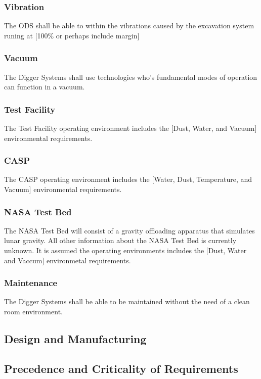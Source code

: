 \subsubsection{Vibration}
The ODS shall be able to within the vibrations caused by the excavation system runing at [100\% or perhaps include margin]
\subsubsection{Vacuum}
The Digger Systems shall use technologies who's fundamental modes of operation can function in a vacuum.
\subsubsection{Test Facility}
The Test Facility operating environment includes the [Dust, Water, and Vacuum] environmental requirements. 
\subsubsection{CASP}
The CASP operating environment includes the [Water, Dust, Temperature, and Vacuum] environmental requirements. 
\subsubsection{NASA Test Bed}
The NASA Test Bed will consist of a gravity offloading apparatus that simulates lunar gravity. All other information about the NASA Test Bed is currently unknown. It is assumed the operating environments includes the [Dust, Water and Vaccum] environmetal requirements.
\subsubsection{Maintenance }
The Digger Systems shall be able to be maintained without the need of a clean room environment.
\subsection{Design and Manufacturing}
\subsubsection{}

\subsection{Precedence and Criticality of Requirements}

